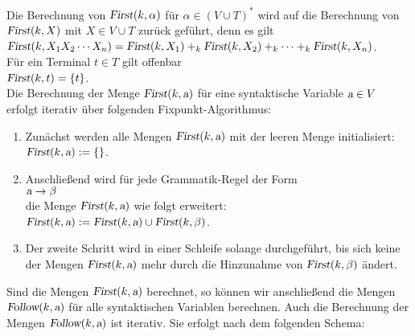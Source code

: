 \noindent
Die Berechnung von $\textsl{First}(k,\alpha)$ f\"ur $\alpha \in (V \cup T)^*$ wird auf die
Berechnung von $\textsl{First}(k, X)$ mit $X \in V \cup T$ zur\"uck gef\"uhrt,
denn es gilt
\\[0.2cm]
\hspace*{1.3cm}
$\textsl{First}(k, X_1 X_2 \cdots X_n) = 
 \textsl{First}(k, X_1) +_k \textsl{First}(k, X_2) +_k \cdots +_k \textsl{First}(k, X_n)$.
\\[0.2cm]
F\"ur ein Terminal $t \in T$ gilt offenbar
\\[0.2cm]
\hspace*{1.3cm}
$\textsl{First}(k, t) = \{ t \}$.
\\[0.2cm]
Die Berechnung der Menge $\textsl{First}(k, \textsl{a})$ f\"ur eine syntaktische Variable $\textsl{a} \in V$
erfolgt iterativ \"uber folgenden Fixpunkt-Algorithmus:
\begin{enumerate}
\item Zun\"achst werden alle Mengen $\textsl{First}(k, \textsl{a})$ mit der leeren Menge initialisiert:
      \\[0.2cm]
      \hspace*{1.3cm}
      $\textsl{First}(k, \textsl{a}) := \{\}$.
\item Anschlie{\ss}end wird f\"ur jede Grammatik-Regel der Form 
      \\[0.2cm]
      \hspace*{1.3cm}
      $\textsl{a} \rightarrow \beta$
      \\[0.2cm]
      die Menge $\textsl{First}(k, \textsl{a})$ wie folgt erweitert:
      \\[0.2cm]
      \hspace*{1.3cm}
      $\textsl{First}(k, \textsl{a}) := \textsl{First}(k, \textsl{a}) \cup \textsl{First}(k,\beta)$.
\item Der zweite Schritt wird in einer Schleife solange durchgef\"uhrt, bis sich keine
      der Mengen $\textsl{First}(k, \textsl{a})$ mehr durch die Hinzunahme von
      $\textsl{First}(k,\beta)$ \"andert.
\end{enumerate}
Sind die Mengen $\textsl{First}(k, \textsl{a})$ berechnet, so k\"onnen wir anschlie{\ss}end die Mengen 
$\textsl{Follow}(k, \textsl{a})$ f\"ur alle syntaktischen Variablen berechnen.  Auch die Berechnung
der Mengen $\textsl{Follow}(k, \textsl{a})$ ist iterativ.  Sie erfolgt nach dem folgenden
Schema:
